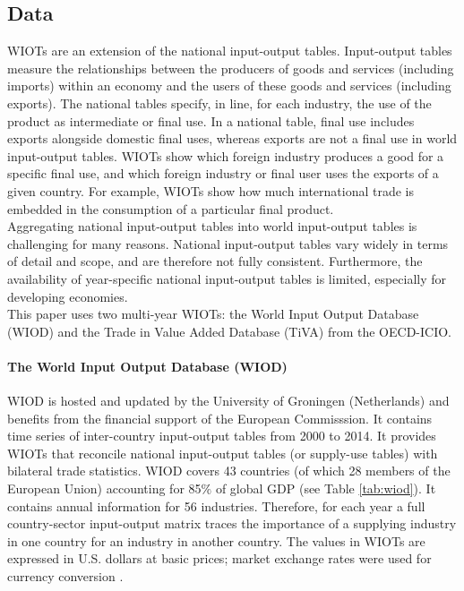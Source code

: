 \documentclass[11pt,a4paper]{article}
\begin{document}
\subsection{Data}
\label{subsec:data}

WIOTs are an extension of the national input-output tables. 
Input-output tables measure the relationships between the producers of goods and services (including imports) within an economy and the users of these goods and services (including exports). The national tables specify, in line, for each industry, the use of the product as intermediate or final use. 
In a national table, final use includes exports alongside domestic final uses, whereas exports are not a final use in world input-output tables. 
WIOTs show which foreign industry produces a good for a specific final use, and which foreign industry or final user uses the exports of a given country. 
For example, WIOTs show how much international trade is embedded in the consumption of a particular final product. \\
Aggregating national input-output tables into world input-output tables is challenging for many reasons. National input-output tables vary widely in terms of detail and scope, and are therefore not fully consistent. Furthermore, the availability of year-specific national input-output tables is limited, especially for developing economies.  \\
This paper uses two multi-year WIOTs: the World Input Output Database (WIOD) and the Trade in Value Added Database (TiVA) from the OECD-ICIO.

\paragraph{The World Input Output Database (WIOD)}
WIOD is hosted and updated by the University of Groningen (Netherlands) and benefits from the financial support of the European Commisssion. 
It contains time series of inter-country input-output tables from 2000 to 2014. 
It provides WIOTs that reconcile national input-output tables (or supply-use tables) with bilateral trade statistics.
WIOD covers 43 countries (of which 28 members of the European Union) accounting for 85$\%$ of global GDP (see Table \ref{tab:wiod}). 
It contains annual information for 56 industries. Therefore, for each year a full country-sector input-output matrix traces the importance of a supplying industry in one country for an industry in another country. The values in WIOTs are expressed in U.S. dollars at basic prices; market exchange rates were used for currency conversion \citep{Timmer2015}. 
\end{document}
